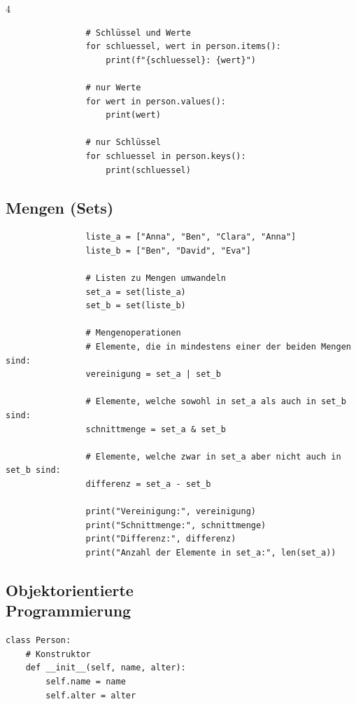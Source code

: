 \begin{landscape}
\begin{multicols*}{4}
\begin{cheatSheetBox}[title=Dictionary durchlaufen]
\begin{lstlisting}
				# Schlüssel und Werte
				for schluessel, wert in person.items():
					print(f"{schluessel}: {wert}")

				# nur Werte
				for wert in person.values():
					print(wert)

				# nur Schlüssel
				for schluessel in person.keys():
					print(schluessel)
			\end{lstlisting}
		\end{cheatSheetBox}

		\columnbreak\textcolor{\cheatSheetColor}{\subsection*{Mengen (Sets)}}
		\begin{cheatSheetBox}[title=Mengen (Sets)]
			\begin{lstlisting}
				liste_a = ["Anna", "Ben", "Clara", "Anna"]
				liste_b = ["Ben", "David", "Eva"]

				# Listen zu Mengen umwandeln
				set_a = set(liste_a)
				set_b = set(liste_b)

				# Mengenoperationen
				# Elemente, die in mindestens einer der beiden Mengen sind:
				vereinigung = set_a | set_b

				# Elemente, welche sowohl in set_a als auch in set_b sind:
				schnittmenge = set_a & set_b

				# Elemente, welche zwar in set_a aber nicht auch in set_b sind:
				differenz = set_a - set_b

				print("Vereinigung:", vereinigung)
				print("Schnittmenge:", schnittmenge)
				print("Differenz:", differenz)
				print("Anzahl der Elemente in set_a:", len(set_a))
			\end{lstlisting}
		\end{cheatSheetBox}

		\columnbreak\textcolor{\cheatSheetColor}{\subsection*{Objektorientierte\\ Programmierung}}

		\begin{cheatSheetBox}[title=Klassen definieren]
			\begin{lstlisting}
class Person:
    # Konstruktor
    def __init__(self, name, alter):
        self.name = name
        self.alter = alter
    

\end{lstlisting}
\end{cheatSheetBox}
\end{multicols*}
\end{landscape}

